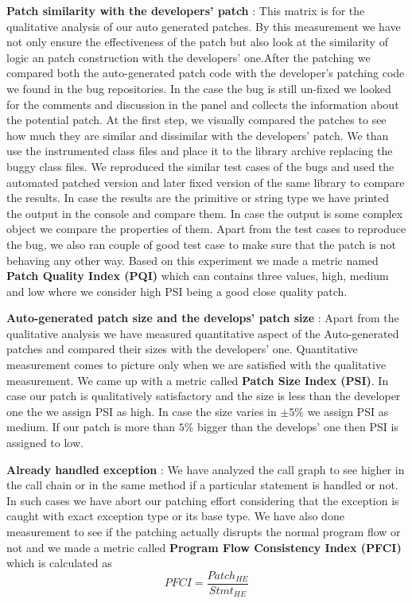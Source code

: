 \begin{mylist}

\item \textbf{Patch similarity with the developers' patch} : This matrix is for
the qualitative analysis of our auto generated patches. By this measurement we
have not only ensure the effectiveness of the patch but also look at the
similarity of logic an patch construction with the developers' one.After the
patching we compared both the auto-generated patch code with the developer's
patching code we found in the bug repositories. In the case the bug is still
un-fixed we looked for the comments and discussion in the panel and collects
the information about the potential patch. At the first step, we visually
compared the patches to see how much they are similar and dissimilar with the
developers' patch. We than use the instrumented class files and place it to the
library archive replacing the buggy class files. We reproduced the similar test
cases of the bugs and used the automated patched version and later fixed version
of the same library to compare the results. In case the results are the
primitive
or string type we have printed the output in the console and compare them. In
case the output is some complex object we compare the properties of them. Apart
from the test cases to reproduce the bug, we also ran couple of good test case
to make sure that the patch is not behaving any other way. Based on this
experiment we made a metric named \textbf{Patch Quality Index (PQI)} which
can contains three values, high, medium and low where we consider high PSI being
a good close quality patch.

\item \textbf{Auto-generated patch size and the develops' patch size} : Apart
from the qualitative analysis we have measured quantitative aspect of the
Auto-generated patches and compared their sizes with the developers' one.
Quantitative measurement comes to picture only when we are satisfied with the
qualitative measurement. We came up with a metric called \textbf{Patch Size
Index (PSI)}. In case our patch is qualitatively satisfactory and the size is
less than the developer one the we assign PSI as high. In case the size varies
in $\pm5\%$ we assign PSI as medium. If our patch is more than $5\%$ bigger than
the develops' one then PSI is assigned to low.

\item \textbf{Already handled exception} : We have analyzed the call graph to
see higher in the call chain or in the same method if a particular statement is
handled or not. In such cases we have abort our patching effort considering that
the exception is caught with exact exception type or its base type. We have also
done measurement to see if the patching actually disrupts the normal program
flow or not and we made a metric called \textbf{Program Flow Consistency Index
(PFCI)} which is calculated as
$$PFCI = \frac{Patch_{HE}}{Stmt_{HE}}$$


\end{mylist}
